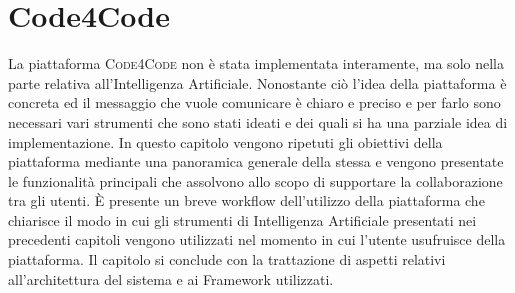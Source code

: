 \chapter{Code4Code} %
%

\begin{citazione}
La piattaforma \textsc{Code4Code} non è stata implementata interamente, ma solo nella parte relativa all'Intelligenza Artificiale. Nonostante ciò l'idea della piattaforma è concreta ed il messaggio che vuole comunicare è chiaro e preciso e per farlo sono necessari vari strumenti che sono stati ideati e dei quali si ha una parziale idea di implementazione. In questo capitolo vengono ripetuti gli obiettivi della piattaforma mediante una panoramica generale della stessa e vengono presentate le funzionalità principali che assolvono allo scopo di supportare la collaborazione tra gli utenti. È presente un breve workflow dell'utilizzo della piattaforma che chiarisce il modo in cui gli strumenti di Intelligenza Artificiale presentati nei precedenti capitoli vengono utilizzati nel momento in cui l'utente usufruisce della piattaforma. Il capitolo si conclude con la trattazione di aspetti relativi all'architettura del sistema e ai Framework utilizzati.
\end{citazione}
\newpage


